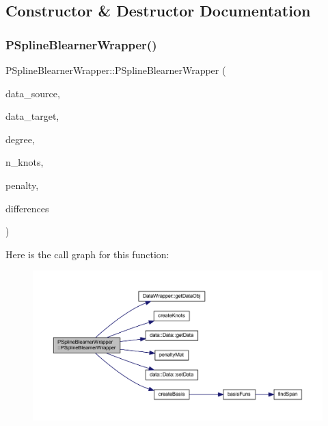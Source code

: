 \subsection{Constructor \& Destructor Documentation}
\mbox{\label{class_p_spline_blearner_wrapper_a1272a29283aa7815d2f4d06ba70cecf6}} 
\subsubsection{\texorpdfstring{P\+Spline\+Blearner\+Wrapper()}{PSplineBlearnerWrapper()}}
{\footnotesize\ttfamily P\+Spline\+Blearner\+Wrapper\+::\+P\+Spline\+Blearner\+Wrapper (\begin{DoxyParamCaption}\item[{\mbox{\hyperlink{class_data_wrapper}{Data\+Wrapper}} \&}]{data\+\_\+source,  }\item[{\mbox{\hyperlink{class_data_wrapper}{Data\+Wrapper}} \&}]{data\+\_\+target,  }\item[{const unsigned int \&}]{degree,  }\item[{const unsigned int \&}]{n\+\_\+knots,  }\item[{const double \&}]{penalty,  }\item[{const unsigned int \&}]{differences }\end{DoxyParamCaption})\hspace{0.3cm}{\ttfamily [inline]}}

Here is the call graph for this function\+:
\nopagebreak
\begin{figure}[H]
\begin{center}
\leavevmode
\includegraphics[width=350pt]{class_p_spline_blearner_wrapper_a1272a29283aa7815d2f4d06ba70cecf6_cgraph}
\end{center}
\end{figure}



